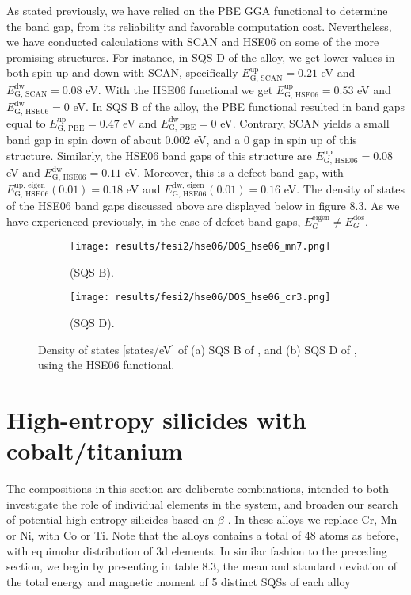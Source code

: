 As stated previously, we have relied on the PBE GGA functional to determine the band gap, from its reliability and favorable computation cost. Nevertheless, we have conducted calculations with SCAN and HSE06 on some of the more promising structures. For instance, in SQS D of the  alloy, we get lower values in both spin up and down with SCAN, specifically $E_\text{G, SCAN} ^\text{up}= 0.21$ eV and $E_\text{G, SCAN} ^\text{dw} = 0.08$ eV. With the HSE06 functional we get $E_\text{G, HSE06} ^\text{up} = 0.53$ eV and $E_\text{G, HSE06} ^\text{dw} = 0$ eV. In SQS B of the  alloy, the PBE functional resulted in band gaps equal to $E_\text{G, PBE} ^\text{up} = 0.47$ eV and $E_\text{G, PBE} ^\text{dw} = 0$ eV. Contrary, SCAN yields a small band gap in spin down of about 0.002 eV, and a 0 gap in spin up of this structure. Similarly, the HSE06 band gaps of this structure are $E_\text{G, HSE06} ^\text{up} = 0.08$ eV and $E_\text{G, HSE06} ^\text{dw} = 0.11$ eV. Moreover, this is a defect band gap, with $E_\text{G, HSE06} ^\text{up, eigen}(0.01) = 0.18$ eV and $E_\text{G, HSE06} ^\text{dw, eigen}(0.01) = 0.16$ eV. The density of states of the HSE06 band gaps discussed above are displayed below in figure 8.3. As we have experienced previously, in the case of defect band gaps, $E_G ^\text{eigen} \neq E_G ^\text{dos}$.   

\begin{figure}[H]
\begin{subfigure}{.5\textwidth}
\texttt{[image: results/fesi2/hse06/DOS\_hse06\_mn7.png]}
\caption{ (SQS B).}
\end{subfigure}
\begin{subfigure}{.5\textwidth}
\texttt{[image: results/fesi2/hse06/DOS\_hse06\_cr3.png]}
\caption{ (SQS D).}
\end{subfigure}
\caption{Density of states [states/eV] of (a) SQS B of , and (b) SQS D of , using the HSE06 functional.}
\end{figure}

\newpage
\section{High-entropy silicides with cobalt/titanium}

The compositions in this section are deliberate combinations, intended to both investigate the role of individual elements in the  system, and broaden our search of potential high-entropy silicides based on $\beta$-. In these alloys we replace Cr, Mn or Ni, with Co or Ti. Note that the alloys contains a total of 48 atoms as before, with equimolar distribution of 3d elements. In similar fashion to the preceding section, we begin by presenting in table 8.3, the mean and standard deviation of the total energy and magnetic moment of 5 distinct SQSs of each alloy

